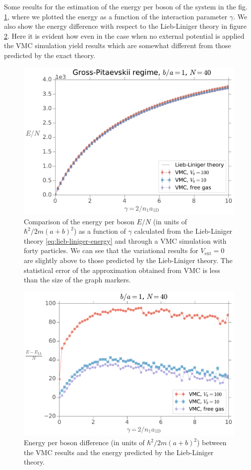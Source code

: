 Some results for the estimation of the energy per boson of the system in the
fig. \ref{fig:phonon-energy-as-gamma-rm-var-Nb-40}, where we plotted the energy
as a function of the interaction parameter $\gamma$. We also show the energy
difference with respect to the Lieb-Liniger theory in figure
\ref{fig:phonon-relative-energy-as-gamma-rm-var-nb-40}. Here it is evident how
even in the case when no external potential is applied the VMC simulation yield
results which are somewhat different from those predicted by the exact theory.
%
\begin{figure}[h!]
  \centering
  \includegraphics[width=0.75\linewidth]{./figures/phonon_energy-as-gamma_rm-var_Nb-40}
  \caption{ Comparison of the energy per boson $E/N$ (in units of $\hbar^2/2m(a
      + b)^2$) as a function of $\gamma$ calculated from the Lieb-Liniger theory
    \eqref{eq:lieb-liniger-energy} and through a VMC simulation with forty
    particles. We can see that the variational results for $V_\mathrm{ext} = 0$
    are slightly above to those predicted by the Lieb-Liniger theory. The
    statistical error of the approximation obtained from VMC is less than the
    size of the graph markers. }
  \label{fig:phonon-energy-as-gamma-rm-var-Nb-40}
\end{figure}
%
\begin{figure}
  \centering
  \includegraphics[width=0.75\linewidth]{./figures/phonon_relative-energy-as-gamma_rm-var_Nb-40}
  \caption{Energy per boson difference (in units of $\hbar^2/2m(a + b)^2$)
    between the VMC results and the energy predicted by the Lieb-Liniger
    theory.}
  \label{fig:phonon-relative-energy-as-gamma-rm-var-nb-40}
\end{figure}
%

